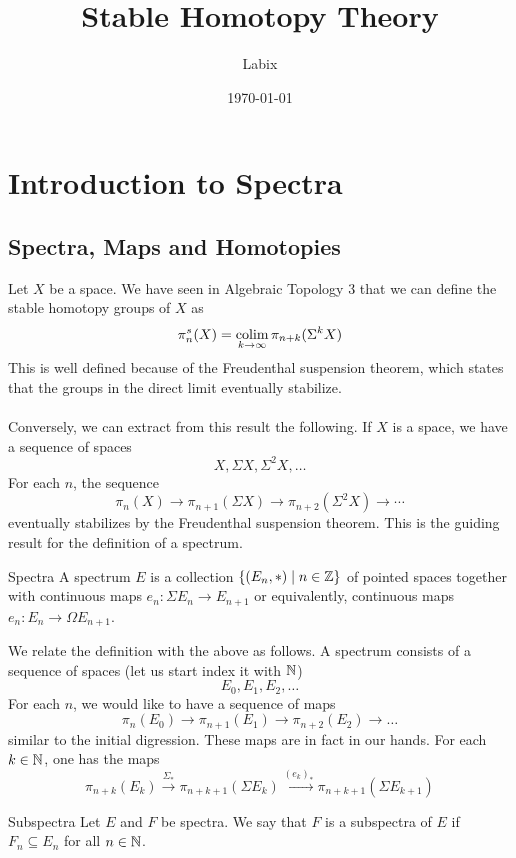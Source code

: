 \documentclass[a4paper]{article}
\title{Stable Homotopy Theory}
\author{Labix}
\date{\today}
\begin{document}
\maketitle
\begin{abstract}
\begin{itemize}
\end{itemize}
\end{abstract}
\pagebreak
\tableofcontents

\pagebreak
\section{Introduction to Spectra}
\subsection{Spectra, Maps and Homotopies}
Let $X$ be a space. We have seen in Algebraic Topology 3 that we can define the stable homotopy groups of $X$ as $$\pi_n^s(X)=\operatorname*{colim}_{k\to\infty}\pi_{n+k}(\Sigma^kX)$$ This is well defined because of the Freudenthal suspension theorem, which states that the groups in the direct limit eventually stabilize. \\~\\

Conversely, we can extract from this result the following. If $X$ is a space, we have a sequence of spaces $$X,\Sigma X,\Sigma^2X,\dots$$ For each $n$, the sequence $$\pi_n(X)\to\pi_{n+1}(\Sigma X)\to\pi_{n+2}(\Sigma^2X)\to\cdots$$ eventually stabilizes by the Freudenthal suspension theorem. This is the guiding result for the definition of a spectrum. 

\begin{defn}{Spectra}{} A spectrum $E$ is a collection $\{(E_n,\ast)\;|\;n\in\mathbb{Z}\}$ of pointed spaces together with continuous maps $e_n:\Sigma E_n\to E_{n+1}$ or equivalently, continuous maps $e_n:E_n\to\Omega E_{n+1}$. 
\end{defn}

We relate the definition with the above as follows. A spectrum consists of a sequence of spaces (let us start index it with $\mathbb{N}$) $$E_0,E_1,E_2,\dots$$ For each $n$, we would like to have a sequence of maps $$\pi_n(E_0)\to\pi_{n+1}(E_1)\to\pi_{n+2}(E_2)\to\dots$$ similar to the initial digression. These maps are in fact in our hands. For each $k\in\mathbb{N}$, one has the maps $$\pi_{n+k}(E_k)\overset{\Sigma_\ast}{\to}\pi_{n+k+1}(\Sigma E_k)\overset{(e_k)_\ast}{\to}\pi_{n+k+1}(\Sigma E_{k+1})$$ 

\begin{defn}{Subspectra}{} Let $E$ and $F$ be spectra. We say that $F$ is a subspectra of $E$ if $F_n\subseteq E_n$ for all $n\in\mathbb{N}$. 
\end{defn}
\end{document}

